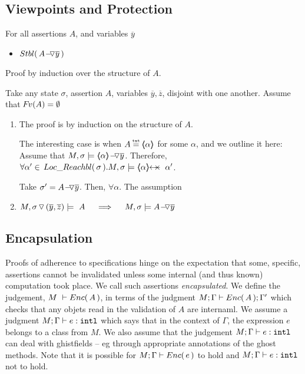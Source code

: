 \subsection{Viewpoints and Protection}

\begin{lemma}
\label{l:adapt:stable}

For all assertions $A$, and variables $\overline y$

\begin{itemize}
\item
$\Stable{ \PushAS y A}$
\end{itemize}

\end{lemma}

Proof by induction over the structure of $A$. 


Take  any state  $\sigma$, assertion $A$,  variables   $\overline y, \overline z$, disjoint with one another.
Assume that  $\fv(A)=\emptyset$
\begin{enumerate}
 \item
 
 The proof is by induction on the structure of $A$. 
 
 The interesting case is when $A\txteq \inside {\alpha}$ for some $\alpha$, and we outline it here:
Assume that $M, \sigma \models \PushAS {y} { \inside {\alpha}}$. 
Therefore, $\forall \alpha'\in \LRelevantO \sigma. M, \sigma \models \protectedFrom  \alpha {\alpha'}$.

Take $\sigma'=  \PushAS {y} {A}$. Then, $\forall \alpha$. The assumption 
\item
$M, { \PushSLong {(\overline y, \overline z)} {\sigma} } \models\  A \  \ \ \ \Longrightarrow  \ \ \ \ M,  \sigma \models  \PushAS  {y} {A}$
\end{enumerate}
\completeProof

\subsection{Encapsulation}

{
Proofs of adherence to {\SpecLang specifications  hinge on the expectation that some, 
specific, assertions cannot be invalidated unless some 
} internal (and thus known) computation took place. 
{We call such assertions   \emph{encapsulated}.}
}
We define the  judgement,  $M\ \vdash  \encaps{A}$, in terms of the judgment  $M; \Gamma \vdash \encaps A  ; \Gamma'$
which checks that any objets read  in the validation of $A$ are internaml.
We assume a judgment $M; \Gamma \vdash e :  \prg{intl}$ which says that in the context of $\Gamma$, the expression $e$ belongs to a class from $M$.
We also assume that the judgement $M; \Gamma \vdash e :  \prg{intl}$ can deal with ghistfields -- eg through appropriate annotations of the ghost methods.
Note that it is possible for $M; \Gamma \vdash \encaps {e}$ to hold and 
$M; \Gamma \vdash  e : \prg{intl}$ not to hold.



